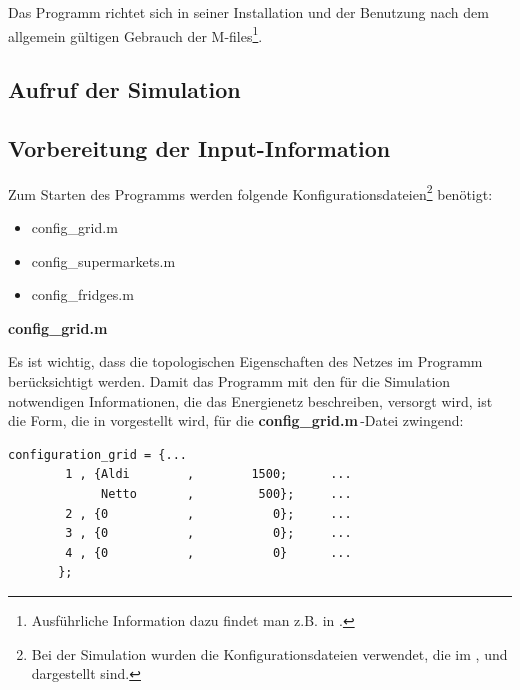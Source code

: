 Das Programm richtet sich in seiner Installation und der Benutzung nach dem
allgemein gültigen Gebrauch der \matlab M-files\footnote{
Ausführliche Information dazu findet man z.B. in \cite{MATLAB-Buch}.}.

\subsection{Aufruf der Simulation}%
\subsection*{Vorbereitung der Input-Information}
\label{sec:input_infos}

Zum Starten des Programms werden folgende Konfigurationsdateien\footnote{ Bei
der Simulation wurden die Konfigurationsdateien verwendet, die im
,  und 
dargestellt sind.} benötigt:

\begin{itemize}
	\item config\_grid.m
	\item config\_supermarkets.m
	\item config\_fridges.m
\end{itemize}
\vspace{3mm}
\noindent\textbf{config\_grid.m}
\vspace{3mm}

Es ist wichtig, dass die topologischen Eigenschaften des Netzes im Programm
berücksichtigt werden. Damit das Programm mit den für die Simulation notwendigen
Informationen, die das Energienetz beschreiben, versorgt wird, ist die Form, die
in  vorgestellt wird, für die \textbf{config\_grid.m$\,$}-Datei
zwingend:

\begin{lstlisting}[float=h,caption={config\_grid.m},label={cgrid}]
%%	Bus,  Supermarkets,	  Number of Supermarkets
configuration_grid = {...
        1 , {Aldi	     ,	      1500;	     ...
             Netto	     ,	       500};	 ...
        2 , {0	         ,           0};	 ...
        3 , {0	         ,           0};	 ...
        4 , {0	         ,           0}	     ...
       };
\end{lstlisting}

